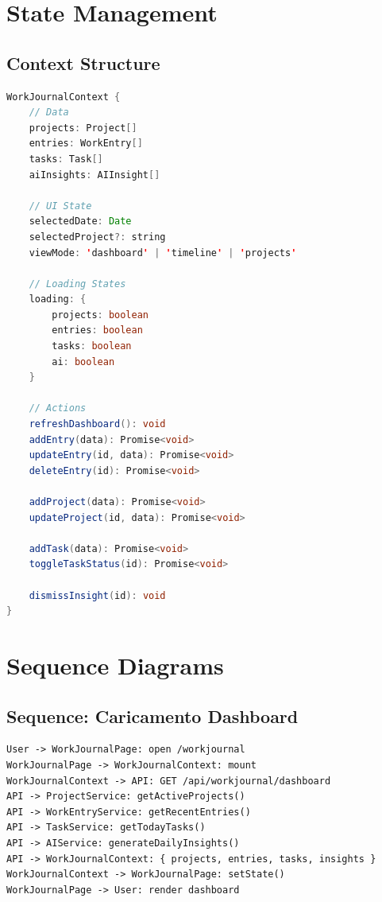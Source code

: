 \documentclass[11pt,a4paper]{article}
\begin{document}
\section{State Management}

\subsection{Context Structure}

\begin{lstlisting}[language=Java, caption=WorkJournalContext - Pseudocodice]
WorkJournalContext {
    // Data
    projects: Project[]
    entries: WorkEntry[]
    tasks: Task[]
    aiInsights: AIInsight[]
    
    // UI State
    selectedDate: Date
    selectedProject?: string
    viewMode: 'dashboard' | 'timeline' | 'projects'
    
    // Loading States
    loading: {
        projects: boolean
        entries: boolean
        tasks: boolean
        ai: boolean
    }
    
    // Actions
    refreshDashboard(): void
    addEntry(data): Promise<void>
    updateEntry(id, data): Promise<void>
    deleteEntry(id): Promise<void>
    
    addProject(data): Promise<void>
    updateProject(id, data): Promise<void>
    
    addTask(data): Promise<void>
    toggleTaskStatus(id): Promise<void>
    
    dismissInsight(id): void
}
\end{lstlisting}

\newpage

\section{Sequence Diagrams}


\subsection{Sequence: Caricamento Dashboard}

\begin{lstlisting}[caption=Sequence Diagram - Pseudocodice]
User -> WorkJournalPage: open /workjournal
WorkJournalPage -> WorkJournalContext: mount
WorkJournalContext -> API: GET /api/workjournal/dashboard
API -> ProjectService: getActiveProjects()
API -> WorkEntryService: getRecentEntries()
API -> TaskService: getTodayTasks()
API -> AIService: generateDailyInsights()
API -> WorkJournalContext: { projects, entries, tasks, insights }
WorkJournalContext -> WorkJournalPage: setState()
WorkJournalPage -> User: render dashboard
\end{lstlisting}
\end{document}
